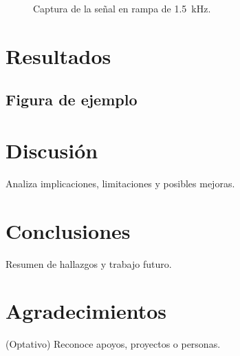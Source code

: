 \documentclass[conference]{IEEEtran} %
\begin{document}
\begin{figure}[H]
    \centering
    \framebox[0.75\linewidth]{\rule{0pt}{3.5cm}}
    \caption{Captura de la señal en rampa de \SI{1.5}{\kilo\hertz}.}
    \label{fig:frecuencia-rampa-1k5hz}
\end{figure}



\section{Resultados}
\subsection{Figura de ejemplo}



\section{Discusión}
Analiza implicaciones, limitaciones y posibles mejoras.

\section{Conclusiones}
Resumen de hallazgos y trabajo futuro.

\section*{Agradecimientos}
(Optativo) Reconoce apoyos, proyectos o personas.
\end{document}
